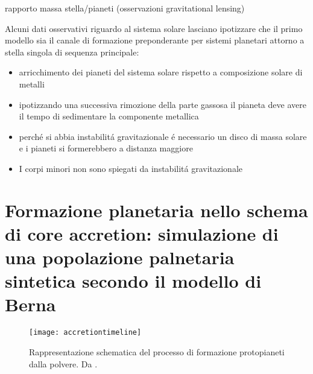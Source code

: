 \documentclass[twoside,11pt,fleqn]{memoir}%
\begin{document}
\begin{workout}
	rapporto massa stella/pianeti (osservazioni gravitational lensing)
\end{workout}

\begin{workout}
	Alcuni dati osservativi riguardo al sistema solare lasciano ipotizzare che il primo modello sia il canale di formazione preponderante per sistemi planetari attorno a stella singola di sequenza principale:
	\begin{itemize}
		\item arricchimento dei pianeti del sistema solare rispetto a composizione solare di metalli%
		\item ipotizzando una successiva rimozione della parte gassosa il pianeta deve avere il tempo di sedimentare la componente metallica
		\item perch\'e si abbia instabilit\'a gravitazionale \'e necessario un disco di massa solare e i pianeti si formerebbero a distanza maggiore
		\item I corpi minori non sono spiegati da instabilit\'a gravitazionale
	\end{itemize}
\end{workout}


\cleartorecto

{\let\clearpage\relax\let\cleardoublepage\relax
\part{Formazione planetaria nello schema di core accretion: simulazione di una popolazione palnetaria sintetica secondo il modello di Berna }\label{part:CApps}
}
\begin{figure}[!ht]
\texttt{[image: accretiontimeline]}\caption{Rappresentazione schematica del processo di formazione protopianeti dalla polvere. Da \cite{perryman2011exoplanet}.}\label{fig:accretiontimeline}
\end{figure}
\end{document}
